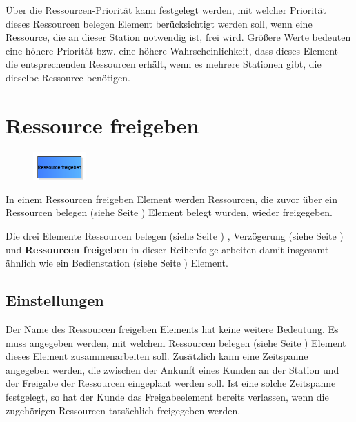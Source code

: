 Über die Ressourcen-Priorität kann festgelegt werden, mit welcher Priorität dieses Ressourcen belegen Element
berücksichtigt werden soll, wenn eine Ressource, die an dieser Station notwendig ist,
frei wird. Größere Werte bedeuten eine höhere Priorität bzw. eine höhere Wahrscheinlichkeit, dass dieses Element
die entsprechenden Ressourcen erhält, wenn es mehrere Stationen gibt, die dieselbe Ressource benötigen.


\section{Ressource freigeben}
\label{ref:ModelElementRelease}

\begin{figure}
\vspace{-22pt}
\includegraphics[width=2cm]{imageModelElementRelease.png}
\vspace{-22pt}
\end{figure}

In einem Ressourcen freigeben Element werden Ressourcen, die zuvor über ein Ressourcen belegen (siehe Seite \pageref{ref:ModelElementSeize}) 
Element belegt wurden, wieder freigegeben.

Die drei Elemente Ressourcen belegen (siehe Seite \pageref{ref:ModelElementSeize}) , Verzögerung (siehe Seite \pageref{ref:ModelElementDelay}) und
\textbf{Ressourcen freigeben} in dieser Reihenfolge arbeiten damit
insgesamt ähnlich wie ein Bedienstation (siehe Seite \pageref{ref:ModelElementProcess}) Element.

\subsection*{Einstellungen}

Der Name des Ressourcen freigeben Elements hat keine weitere Bedeutung. Es muss angegeben werden, mit welchem
Ressourcen belegen (siehe Seite \pageref{ref:ModelElementSeize}) Element dieses Element zusammenarbeiten soll.
Zusätzlich kann eine Zeitspanne angegeben werden, die zwischen der Ankunft eines Kunden an der Station und
der Freigabe der Ressourcen eingeplant werden soll. Ist eine solche Zeitspanne festgelegt, so hat der Kunde
das Freigabeelement bereits verlassen, wenn die zugehörigen Ressourcen tatsächlich freigegeben werden.  


